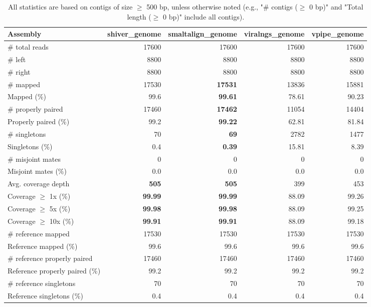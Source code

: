 \documentclass[12pt,a4paper]{article}
\begin{document}
\begin{table}[ht]
\begin{center}
\caption{All statistics are based on contigs of size $\geq$ 500 bp, unless otherwise noted (e.g., "\# contigs ($\geq$ 0 bp)" and "Total length ($\geq$ 0 bp)" include all contigs).}
\begin{tabular}{|l*{4}{|r}|}
\hline
Assembly & shiver\_genome & smaltalign\_genome & viralngs\_genome & vpipe\_genome \\ \hline
\# total reads & 17600 & 17600 & 17600 & 17600 \\ \hline
\# left & 8800 & 8800 & 8800 & 8800 \\ \hline
\# right & 8800 & 8800 & 8800 & 8800 \\ \hline
\# mapped & 17530 & {\bf 17531} & 13836 & 15881 \\ \hline
Mapped (\%) & 99.6 & {\bf 99.61} & 78.61 & 90.23 \\ \hline
\# properly paired & 17460 & {\bf 17462} & 11054 & 14404 \\ \hline
Properly paired (\%) & 99.2 & {\bf 99.22} & 62.81 & 81.84 \\ \hline
\# singletons & 70 & {\bf 69} & 2782 & 1477 \\ \hline
Singletons (\%) & 0.4 & {\bf 0.39} & 15.81 & 8.39 \\ \hline
\# misjoint mates & 0 & 0 & 0 & 0 \\ \hline
Misjoint mates (\%) & 0.0 & 0.0 & 0.0 & 0.0 \\ \hline
Avg. coverage depth & {\bf 505} & {\bf 505} & 399 & 453 \\ \hline
Coverage $\geq$ 1x (\%) & {\bf 99.99} & {\bf 99.99} & 88.09 & 99.26 \\ \hline
Coverage $\geq$ 5x (\%) & {\bf 99.98} & {\bf 99.98} & 88.09 & 99.25 \\ \hline
Coverage $\geq$ 10x (\%) & {\bf 99.91} & {\bf 99.91} & 88.09 & 99.18 \\ \hline
\# reference mapped & 17530 & 17530 & 17530 & 17530 \\ \hline
Reference mapped (\%) & 99.6 & 99.6 & 99.6 & 99.6 \\ \hline
\# reference properly paired & 17460 & 17460 & 17460 & 17460 \\ \hline
Reference properly paired (\%) & 99.2 & 99.2 & 99.2 & 99.2 \\ \hline
\# reference singletons & 70 & 70 & 70 & 70 \\ \hline
Reference singletons (\%) & 0.4 & 0.4 & 0.4 & 0.4 \\ \hline

\end{tabular}
\end{center}
\end{table}
\end{document}
